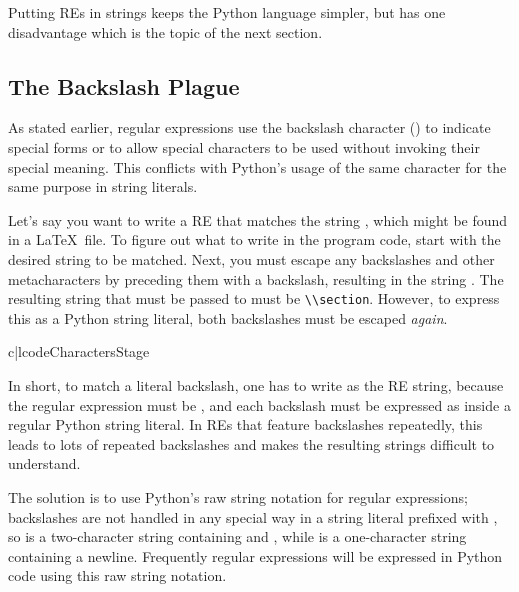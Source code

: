 \documentclass{howto}
\begin{document}
Putting REs in strings keeps the Python language simpler, but has one
disadvantage which is the topic of the next section.

\subsection{The Backslash Plague}

As stated earlier, regular expressions use the backslash
character (\character{\e}) to indicate special forms or to allow
special characters to be used without invoking their special meaning.
This conflicts with Python's usage of the same character for the same
purpose in string literals.

Let's say you want to write a RE that matches the string
, which might be found in a \LaTeX\ file.  To figure
out what to write in the program code, start with the desired string
to be matched.  Next, you must escape any backslashes and other
metacharacters by preceding them with a backslash, resulting in the
string .  The resulting string that must be passed
to  must be \verb|\\section|.  However, to
express this as a Python string literal, both backslashes must be
escaped \emph{again}.

\begin{tableii}{c|l}{code}{Characters}{Stage}
\end{tableii}

In short, to match a literal backslash, one has to write
 as the RE string, because the regular expression
must be \samp{\e\e}, and each backslash must be expressed as
\samp{\e\e} inside a regular Python string literal.  In REs that
feature backslashes repeatedly, this leads to lots of repeated
backslashes and makes the resulting strings difficult to understand.

The solution is to use Python's raw string notation for regular
expressions; backslashes are not handled in any special way in
a string literal prefixed with , so  is a
two-character string containing \character{\e} and ,
while  is a one-character string containing a newline.
Frequently regular expressions will be expressed in Python
code using this raw string notation.  
\end{document}
